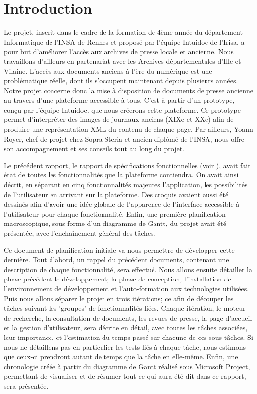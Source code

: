 \section{Introduction}
\label{sec:intro}
	
	Le projet, inscrit dans le cadre de la formation de 4ème année du département Informatique de l’INSA de Rennes et proposé par l’équipe Intuidoc de l’Irisa, a pour but d’améliorer l’accès aux archives de presse locale et ancienne. Nous travaillons d'ailleurs en partenariat avec les Archives départementales d'Ille-et-Vilaine. L'accès aux documents anciens à l'ère du numérique est une problématique réelle, dont ils s'occupent maintenant depuis plusieurs années. Notre projet concerne donc la mise à disposition de documents de presse ancienne au travers d'une plateforme accessible à tous. C'est à partir d'un prototype, conçu par l'équipe Intuidoc, que nous créerons cette plateforme. Ce prototype permet d'interpréter des images de journaux anciens (XIXe et XXe) afin de produire une représentation XML du contenu de chaque page. Par ailleurs, Yoann Royer, chef de projet chez Sopra Steria et ancien diplômé de l'INSA, nous offre son accompagnement et ses conseils tout au long du projet.

	Le précédent rapport, le rapport de spécifications fonctionnelles (voir \cite{Specs}), avait fait état de toutes les fonctionnalités que la plateforme contiendra. On avait ainsi décrit, en séparant en cinq fonctionnalités majeures l'application, les possibilités de l'utilisateur en arrivant sur la plateforme. Des croquis avaient aussi été dessinés afin d'avoir une idée globale de l'apparence de l'interface accessible à l'utilisateur pour chaque fonctionnalité. Enfin, une première planification macroscopique, sous forme d'un diagramme de Gantt, du projet avait été présentée, avec l'enchaînement général des tâches.

	Ce document de planification initiale va nous permettre de développer cette dernière. Tout d'abord, un rappel du précédent documents, contenant une description de chaque fonctionnalité, sera effectué. Nous allons ensuite détailler la phase précédent le développement; la phase de conception, l'installation de l'environnement de développement et l'auto-formation aux technologies utilisées. Puis nous allons séparer le projet en trois itérations; ce afin de découper les tâches suivant les 'groupes' de fonctionnalités liées. Chaque itération, le moteur de recherche, la consultation de documents, les revues de presse, la page d'accueil et la gestion d'utilisateur, sera décrite en détail, avec toutes les tâches associées, leur importance, et l'estimation du temps passé sur chacune de ces sous-tâches. Si nous ne détaillons pas en particulier les tests liés à chaque tâche, nous estimons que ceux-ci prendront autant de temps que la tâche en elle-même. Enfin, une chronologie créée à partir du diagramme de Gantt réalisé sous Microsoft Project, permettant de visualiser et de résumer tout ce qui aura été dit dans ce rapport, sera présentée.
